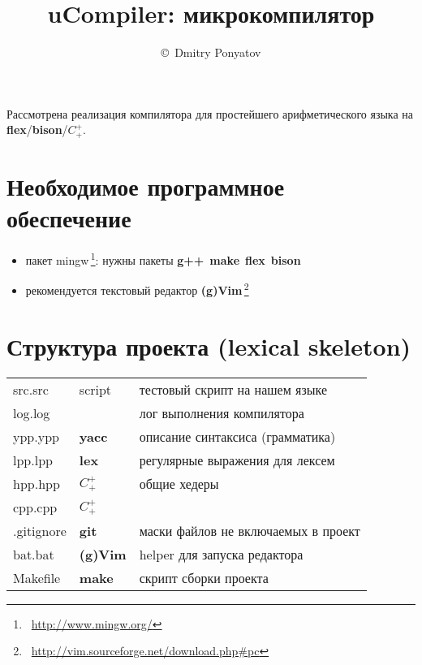 \documentclass[oneside,10pt]{article}
\title{uCompiler: микрокомпилятор}
\author{\copyright\ Dmitry Ponyatov \email{dponyatov@gmail.com}}
\newcommand{\note}[1]{\,\footnote{\ #1}}
\newcommand{\cpp}{$C^+_+$}
\newcommand{\make}{\textbf{make}}
\newcommand{\git}{\textbf{git}}
\newcommand{\gvim}{\textbf{(g)Vim}}
\newcommand{\flex}{\textbf{flex}}
\newcommand{\lex}{\textbf{lex}}
\newcommand{\yacc}{\textbf{yacc}}
\newcommand{\bison}{\textbf{bison}}
\newcommand{\gpp}{\textbf{g++}}
\newcommand{\lst}[2]{}
\begin{document}
\maketitle
\begin{abstracts}
Рассмотрена реализация компилятора для простейшего арифметического языка на
\flex/\bison/\cpp.
\end{abstracts}
\clearpage\tableofcontents\clearpage

\section{Необходимое программное обеспечение}

\begin{itemize}
  \item пакет {mingw}\note{\url{http://www.mingw.org/}}: нужны пакеты
  \gpp\ \make\ \flex\ \bison
  \item рекомендуется текстовый редактор
  \gvim\note{\url{http://vim.sourceforge.net/download.php#pc}}
\end{itemize}

\section{Структура проекта (lexical skeleton)}

\begin{tabular}{l l l}
src.src & script & тестовый скрипт на нашем языке \\
log.log & & лог выполнения компилятора \\
ypp.ypp & \yacc & описание синтаксиса (грамматика) \\
lpp.lpp & \lex & регулярные выражения для лексем \\
hpp.hpp & \cpp & общие хедеры \\
cpp.cpp & \cpp & \\
.gitignore & \git & маски файлов не включаемых в проект \\
bat.bat & \gvim & helper для запуска редактора \\
Makefile & \make & скрипт сборки проекта \\
\end{tabular}

\lst{Makefile}{doc/00.mk}
\end{document}
